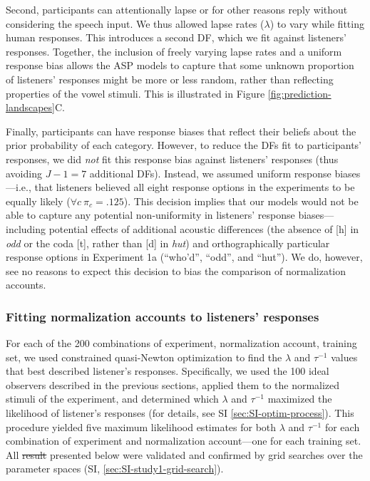 \documentclass[preprint]{JASA}
\providecommand{\DIFadd}[1]{{\protect\color{blue}\uwave{#1}}} %
\providecommand{\DIFdel}[1]{{\protect\color{red}\sout{#1}}}                      %
\providecommand{\DIFaddbegin}{} %
\providecommand{\DIFaddend}{} %
\providecommand{\DIFdelbegin}{} %
\providecommand{\DIFdelend}{} %
\begin{document}
Second, participants can attentionally lapse or for other reasons reply without considering the speech input. We thus allowed lapse rates (\(\lambda\)) to vary while fitting human responses. This introduces a second DF, which we fit against listeners' responses. Together, the inclusion of freely varying lapse rates and a uniform response bias allows the ASP models to capture that some unknown proportion of listeners' responses might be more or less random, rather than reflecting properties of the vowel stimuli. This is illustrated in Figure \ref{fig:prediction-landscapes}C.

Finally, participants can have response biases that reflect their beliefs about the prior probability of each category. However, to reduce the DFs fit to participants' responses, we did \emph{not} fit this response bias against listeners' responses (thus avoiding \(J - 1 = 7\) additional DFs). Instead, we assumed uniform response biases---i.e., that listeners believed all eight response options in the experiments to be equally likely (\(\forall c\ \pi_c = .125\)). This decision implies that our models would not be able to capture any potential non-uniformity in listeners' response biases---including potential effects of additional acoustic differences (the absence of {[}h{]} in \emph{odd} or the coda {[}t{]}, rather than {[}d{]} in \emph{hut}) and orthographically particular response options in Experiment 1a (``who'd'', ``odd'', and ``hut''). We do, however, see no reasons to expect this decision to bias the comparison of normalization accounts.

\subsubsection{Fitting normalization accounts to listeners' responses}\DIFdelbegin %
\DIFdelend \DIFaddbegin \label{sec:fitting-accounts}
\DIFaddend 

For each of the 200 combinations of experiment, normalization account, training set, we used constrained quasi-Newton optimization \citep[as implemented in \texttt{R}'s \texttt{optim()} function]{byrd1995} to find the \(\lambda\) and \(\tau^{-1}\) values that best described listener's responses. Specifically, we used the 100 ideal observers described in the previous sections, applied them to the normalized stimuli of the experiment, and determined which \(\lambda\) and \(\tau^{-1}\) maximized the likelihood of listener's responses (for details, see SI \ref{sec:SI-optim-process}). This procedure yielded five maximum likelihood estimates for both \(\lambda\) and \(\tau^{-1}\) for each combination of experiment and normalization account---one for each training set. All \DIFdelbegin \DIFdel{result }\DIFdelend \DIFaddbegin \DIFadd{results }\DIFaddend presented below were validated and confirmed by grid searches over the parameter spaces (SI, \ref{sec:SI-study1-grid-search}).
\end{document}
